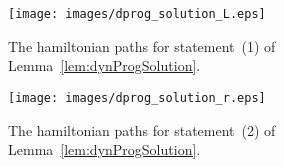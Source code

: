 \documentclass{myllncs-mixalis}
\begin{document}
\begin{figure}[htb]
  \begin{minipage}{.47\textwidth}
    \centering
    \texttt{[image: images/dprog\_solution\_L.eps]}
    \caption{The hamiltonian paths for statement~(1) of Lemma~\ref{lem:dynProgSolution}.}
    \label{fig:dynProgSolutionLEFT-L}
  \end{minipage}
  \hfill
    \begin{minipage}{.47\textwidth}
    \centering
    \texttt{[image: images/dprog\_solution\_r.eps]}
    \caption{The hamiltonian paths for statement~(2) of Lemma~\ref{lem:dynProgSolution}.}
    \label{fig:dynProgSolutionLEFT-R}
  \end{minipage}
\end{figure}
\end{document}
